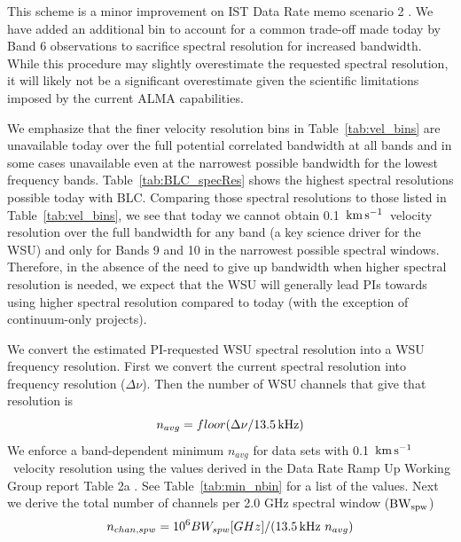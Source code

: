 \documentclass[preprint]{aastex631}
\newcommand{\kms}{\ensuremath{\rm{ km \, s^{-1}}}}
\begin{document}

This scheme is a minor improvement on IST Data Rate memo scenario 2 \citep{Carpenter2022EstimatedUpgrade}. We have added an additional bin to account for a common trade-off made today by Band 6 observations to sacrifice spectral resolution for increased bandwidth.   While this procedure may slightly overestimate the requested spectral resolution, it will likely not be a significant overestimate given the scientific limitations imposed by the current ALMA capabilities.

We emphasize that the finer velocity resolution bins in Table~\ref{tab:vel_bins} are unavailable today over the full potential correlated bandwidth at all bands and in some cases unavailable even at the narrowest possible bandwidth for the lowest frequency bands. Table~\ref{tab:BLC_specRes} shows the highest spectral resolutions possible today with BLC. Comparing those spectral resolutions to those listed in Table~\ref{tab:vel_bins}, we see that today we cannot obtain 0.1~\kms\ velocity resolution over the full bandwidth for any band (a key science driver for the WSU) and only for Bands 9 and 10 in the narrowest possible spectral windows. Therefore, in the absence of the need to give up bandwidth when higher spectral resolution is needed, we expect that the WSU will generally lead PIs towards using higher spectral resolution compared to today (with the exception of continuum-only projects).



We convert the estimated PI-requested WSU spectral resolution into a WSU frequency resolution. First we convert the current spectral resolution into frequency resolution ($\Delta \nu$). Then the number of WSU channels that give that resolution is
\begin{equation}
  n_{avg} = floor ( \Delta \nu / 13.5 {\, \rm kHz})
\end{equation}
We enforce a band-dependent minimum $n_{avg}$ for data sets with 0.1~\kms\ velocity resolution using the values derived in the Data Rate Ramp Up Working Group report Table 2a \citep{Carpenter2023DataRates}. See Table~\ref{tab:min_nbin} for a list of the values.
Next we derive the total number of channels per 2.0 GHz spectral window (${\rm BW_{spw}}$)
\begin{equation}
  n_{chan,spw} = 10^{6} BW_{spw} [GHz] / ( 13.5 {\, \rm kHz} \ n_{avg})
\end{equation}
\end{document}
